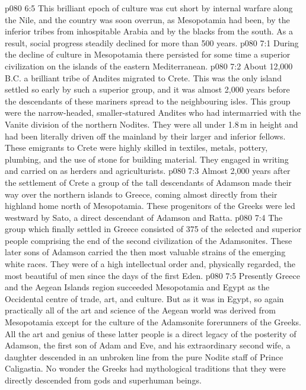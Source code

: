 \vs p080 6:5 This brilliant epoch of culture was cut short by internal warfare along the Nile, and the country was soon overrun, as Mesopotamia had been, by the inferior tribes from inhospitable Arabia and by the blacks from the south. As a result, social progress steadily declined for more than 500 years.
\vs p080 7:1 During the decline of culture in Mesopotamia there persisted for some time a superior civilization on the islands of the eastern Mediterranean.
\vs p080 7:2 About 12,000\,B.C. a brilliant tribe of Andites migrated to Crete. This was the only island settled so early by such a superior group, and it was almost 2,000 years before the descendants of these mariners spread to the neighbouring isles. This group were the narrow\hyp{}headed, smaller\hyp{}statured Andites who had intermarried with the Vanite division of the northern Nodites. They were all under 1.8\,m in height and had been literally driven off the mainland by their larger and inferior fellows. These emigrants to Crete were highly skilled in textiles, metals, pottery, plumbing, and the use of stone for building material. They engaged in writing and carried on as herders and agriculturists.
\vs p080 7:3 Almost 2,000 years after the settlement of Crete a group of the tall descendants of Adamson made their way over the northern islands to Greece, coming almost directly from their highland home north of Mesopotamia. These progenitors of the Greeks were led westward by Sato, a direct descendant of Adamson and Ratta.
\vs p080 7:4 The group which finally settled in Greece consisted of 375 of the selected and superior people comprising the end of the second civilization of the Adamsonites. These later sons of Adamson carried the then most valuable strains of the emerging white races. They were of a high intellectual order and, physically regarded, the most beautiful of men since the days of the first Eden.
\vs p080 7:5 \pc Presently Greece and the Aegean Islands region succeeded Mesopotamia and Egypt as the Occidental centre of trade, art, and culture. But as it was in Egypt, so again practically all of the art and science of the Aegean world was derived from Mesopotamia except for the culture of the Adamsonite forerunners of the Greeks. All the art and genius of these latter people is a direct legacy of the posterity of Adamson, the first son of Adam and Eve, and his extraordinary second wife, a daughter descended in an unbroken line from the pure Nodite staff of Prince Caligastia. No wonder the Greeks had mythological traditions that they were directly descended from gods and superhuman beings.
